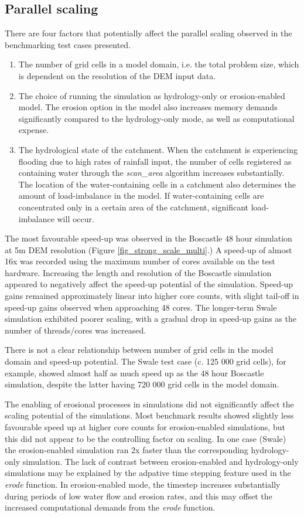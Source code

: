 \subsection{Parallel scaling}
There are four factors that potentially affect the parallel scaling observed in the benchmarking test cases presented. 
\begin{enumerate}
\item The number of grid cells in a model domain, i.e. the total problem size, which is dependent on the resolution of the DEM input data. 
\item The choice of running the simulation as hydrology-only or erosion-enabled model. The erosion option in the model also increases memory demands significantly compared to the hydrology-only mode, as well as computational expense.
\item The hydrological state of the catchment. When the catchment is experiencing flooding due to high rates of rainfall input, the number of cells registered as containing water through the \textit{scan\_area} algorithm increases substantially. The location of the water-containing cells in a catchment also determines the amount of load-imbalance in the model. If water-containing cells are concentrated only in a certain area of the catchment, significant load-imbalance will occur. 
\end{enumerate}

The most favourable speed-up was observed in the Boscastle 48 hour simulation at 5m DEM resolution (Figure \ref{fig_strong_scale_multi}.) A speed-up of almost 16x was recorded using the maximum number of cores available on the test hardware. Increasing the length and resolution of the Boscastle simulation appeared to negatively affect the speed-up potential of the simulation. Speed-up gains remained approximately linear into higher core counts, with slight tail-off in speed-up gains observed when approaching 48 cores. The longer-term Swale simulation exhibited poorer scaling, with a gradual drop in speed-up gains as the number of threads/cores was increased. 

There is not a clear relationship between number of grid cells in the model domain and speed-up potential. The Swale test case (c. 125 000 grid cells), for example, showed almost half as much speed up as the 48 hour Boscastle simulation, despite the latter having 720 000 grid cells in the model domain. 

The enabling of erosional processes in simulations did not significantly affect the scaling potential of the simulations. Most benchmark results showed slightly less favourable speed up at higher core counts for erosion-enabled simulations, but this did not appear to be the controlling factor on scaling. In one case (Swale) the erosion-enabled simulation ran 2x faster than the corresponding hydrology-only simulation. The lack of contrast between erosion-enabled and hydrology-only simulations may be explained by the adpative time stepping feature used in the \textit{erode} function. In erosion-enabled mode, the timestep increases substantially during periods of low water flow and erosion rates, and this may offset the increased computational demands from the \textit{erode} function.

